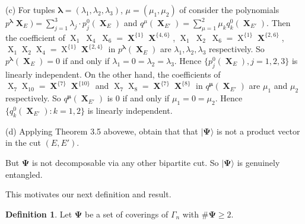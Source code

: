 \documentclass[a4paper,12pt]{article}
\DeclareMathOperator{\x}{\mathrm{X}}
\theoremstyle{definition}
\theoremstyle{underlinethm}
\newtheorem{definition}{Definition}[section]
\theoremstyle{definition}
\begin{document}
 (c) For tuples $\boldsymbol{\lambda} = (\lambda_{1}, \lambda_{2}, \lambda_{3})$, $\mu =(\mu_{1}, \mu_{2})$ of consider the polynomials $p^{\boldsymbol{\lambda}}{\boldsymbol{\x}_{E}}) = \sum\limits_{j=1}^{3} \lambda_{j} \cdot p_{j}^{0} (\boldsymbol{\x}_{E})$ and $q^{\mu}(\boldsymbol{\x}_{E'}) = \sum\limits_{\mu =1}^{2} \mu_{k} q_{k}^{0} (\boldsymbol{\x}_{E'})$. Then the coefficient of $\x_{1}~ \x_{4}~\x_{6} = \boldsymbol{\x}^{\{1\}} \boldsymbol{\x}^{\{4,6\}}$, $\x_{1}~ \x_{2} ~\x_{6} = \x^{\{1\}} \boldsymbol{\x}^{\{2,6\}}$, $\x_{1} \x_{2} \x_{4} = \x^{\{1\}} \boldsymbol{\x}^{\{2,4\}}$ in $p^{\boldsymbol{\lambda}}(\boldsymbol{\x}_{E})$ are $\lambda_{1}, \lambda_{2}, \lambda_{3}$ respectively. So $p^{\boldsymbol{\lambda}}(\boldsymbol{\x}_{E}) =0$ if and only if $\lambda_{1} = 0 = \lambda_{2} = \lambda_{3}$. Hence $\{p_{j}^{0}(\boldsymbol{\x}_{E}), j = 1, 2, 3\}$  is linearly independent. On the other hand, the coefficients of $\x_{7} \x_{10} = \boldsymbol{\x}^{\{7\}} \boldsymbol{\x}^{\{10\}}$ and $\x_{7} \x_{8} = \boldsymbol{\x}^{\{7\}} \boldsymbol{\x}^{\{8\}}$ in $q^{\boldsymbol{\mu}}(\boldsymbol{\x}_{E'})$ are $\mu_{1}$ and $\mu_{2}$ respectively. So $q^{\boldsymbol{\mu}} (\boldsymbol{\x}_{E'})$ is $0$ if and only if $\mu_{1} =0 =\mu_{2}$. Hence $\{q_{k}^{0}(\boldsymbol{\x}_{E'}): k = 1,2\}$ is linearly independent. 
 
  (d) Applying Theorem 3.5 abovewe,  obtain that that $| \boldsymbol{\Psi} \rangle$ is not a product vector in the cut $(E,E')$.
 
 But $\boldsymbol{\Psi}$ is not decomposable via any other bipartite cut. So $| \boldsymbol{\Psi} \rangle$ is genuinely entangled.
 
 This motivates our next definition and result.
 
\begin{definition}\label{definition-3.3}
Let $\boldsymbol{\Psi}$ be a set of coverings of $\Gamma_{n}$ with $\# \boldsymbol{\Psi} \geq 2$.
\end{definition}
\end{document}
